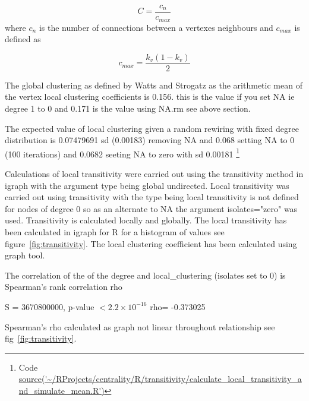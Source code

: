 \begin{equation}
C = \frac{c_n}{c_{max}}
\end{equation}
where $c_n$ is the number of connections between a vertexes neighbours and $c_{max}$ is defined as 

\begin{equation}
c_{max} = \frac{k_v(1-k_v)}{2}
\end{equation}

The global clustering as defined by Watts and Strogatz as the arithmetic mean of the vertex local clustering coefficients is 0.156.\cite{watts1998collective} this is the value if you set NA ie degree 1 to 0 and 0.171 is the value using NA.rm see above section. 

The expected value of local clustering given a random rewiring with fixed degree distribution is 0.07479691 sd (0.00183) removing NA and 0.068 setting NA to 0 (100 iterations) and 0.0682 seeting NA to zero with sd 0.00181 \footnote{Code  \url{source('~/RProjects/centrality/R/transitivity/calculate_local_transitivity_and_simulate_mean.R')} }

Calculations of local transitivity were carried out using the transitivity method in igraph with the argument type being global undirected. Local transitivity was carried out using transitivity with the type being local transitivity is not defined for nodes of degree 0 so as an alternate to NA the argument isolates="zero" was used. 
Transitivity is calculated locally and globally. The local transitivity has been calculated in igraph for R for a histogram of values see figure~\ref{fig:transitivity}. The local clustering coefficient has been calculated using graph tool. 

The correlation of the of the degree and local\_clustering (isolates set to 0)  is 
	Spearman's rank correlation rho

S = 3670800000, p-value $< 2.2 \times 10^{-16}$
      rho= 
-0.373025 

Spearman's rho calculated as graph not linear throughout relationship see fig~\ref{fig:transitivity}.

